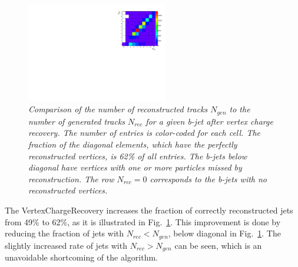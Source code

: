 \begin{figure}
{\centering
    \includegraphics[width=0.55\textwidth]{ILD/plots/recovery-table.pdf}
    \caption{\sl Comparison of the number of reconstructed tracks $N_{gen}$ to the number of generated tracks $N_{rec}$ for a given b-jet after vertex charge recovery. The number of entries is color-coded for each cell. The fraction of the diagonal elements, which have the perfectly reconstructed vertices, is 62\% of all entries. The b-jets below diagonal have vertices with one or more particles missed by reconstruction. The row $N_{rec} = 0$ corresponds to the b-jets with no reconstructed vertices. %
    }
    \label{fig:RecoveryTable_3}
  }
\end{figure}


The VertexChargeRecovery increases the fraction of correctly reconstructed jets from 49\% to 62\%, as it is illustrated in Fig.~\ref{fig:RecoveryTable_3}. 
This improvement is done by reducing the fraction of jets with $N_{rec} < N_{gen}$, below diagonal in Fig.~\ref{fig:RecoveryTable_3}. 
The slightly increased rate of jets with $N_{rec} > N_{gen}$ can be seen, which is an unavoidable shortcoming of the algorithm. 



